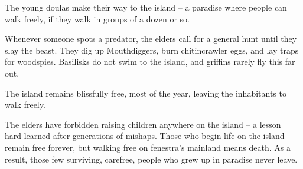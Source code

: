 \begin{multicols}{2}
\begin{exampletext}
  The young \glspl{doula} make their way to the island -- a paradise where people can walk freely, if they walk in groups of a dozen or so.

  Whenever someone spots a predator, the elders call for a general hunt until they slay the beast.
  They dig up Mouthdiggers, burn chitincrawler eggs, and lay traps for woodspies.
  Basilisks do not swim to the island, and griffins rarely fly this far out.

  The island remains blissfully free, most of the year, leaving the inhabitants to walk freely.

  The elders have forbidden raising children anywhere on the island -- a lesson hard-learned after generations of mishaps.
  Those who begin life on the island remain free forever, but walking free on \gls{fenestra}'s mainland means death.
  As a result, those few surviving, carefree, people who grew up in paradise never leave.
\end{exampletext}

\end{multicols}
